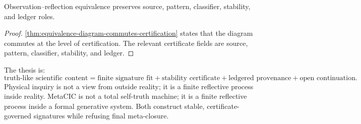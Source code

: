 \begin{corollary}
\label{cor:equivalence-certificate-preserving}
Observation--reflection equivalence preserves source, pattern, classifier, stability, and ledger roles.
\end{corollary}

\begin{proof}
\autoref{thm:equivalence-diagram-commutes-certification} states that the diagram commutes at the level of certification. The relevant certificate fields are source, pattern, classifier, stability, and ledger.
\end{proof}

\begin{remark}
\label{rem:observation-reflection-compressed-form}
The thesis is:
$$
\text{truth-like scientific content}
=
\text{finite signature fit}
+
\text{stability certificate}
+
\text{ledgered provenance}
+
\text{open continuation}.
$$
Physical inquiry is not a view from outside reality; it is a finite reflective process inside reality. MetaCIC is not a total self-truth machine; it is a finite reflective process inside a formal generative system. Both construct stable, certificate-governed signatures while refusing final meta-closure.
\end{remark}

